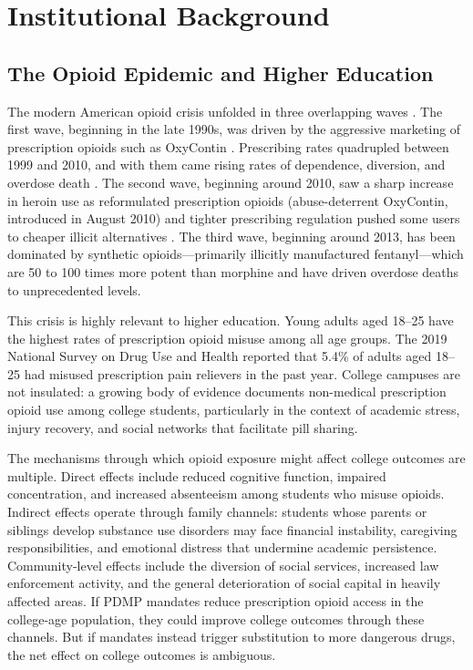 \documentclass[12pt]{article}
\begin{document}
\section{Institutional Background}

\subsection{The Opioid Epidemic and Higher Education}

The modern American opioid crisis unfolded in three overlapping waves \citep{dave2022opioid}. The first wave, beginning in the late 1990s, was driven by the aggressive marketing of prescription opioids such as OxyContin \citep{quinones2015dreamland}. Prescribing rates quadrupled between 1999 and 2010, and with them came rising rates of dependence, diversion, and overdose death \citep{case2015rising}. The second wave, beginning around 2010, saw a sharp increase in heroin use as reformulated prescription opioids (abuse-deterrent OxyContin, introduced in August 2010) and tighter prescribing regulation pushed some users to cheaper illicit alternatives \citep{alpert2018supply, evans2019opioid}. The third wave, beginning around 2013, has been dominated by synthetic opioids---primarily illicitly manufactured fentanyl---which are 50 to 100 times more potent than morphine and have driven overdose deaths to unprecedented levels.

This crisis is highly relevant to higher education. Young adults aged 18--25 have the highest rates of prescription opioid misuse among all age groups. The 2019 National Survey on Drug Use and Health reported that 5.4\% of adults aged 18--25 had misused prescription pain relievers in the past year. College campuses are not insulated: a growing body of evidence documents non-medical prescription opioid use among college students, particularly in the context of academic stress, injury recovery, and social networks that facilitate pill sharing.

The mechanisms through which opioid exposure might affect college outcomes are multiple. Direct effects include reduced cognitive function, impaired concentration, and increased absenteeism among students who misuse opioids. Indirect effects operate through family channels: students whose parents or siblings develop substance use disorders may face financial instability, caregiving responsibilities, and emotional distress that undermine academic persistence. Community-level effects include the diversion of social services, increased law enforcement activity, and the general deterioration of social capital in heavily affected areas. If PDMP mandates reduce prescription opioid access in the college-age population, they could improve college outcomes through these channels. But if mandates instead trigger substitution to more dangerous drugs, the net effect on college outcomes is ambiguous.
\end{document}
